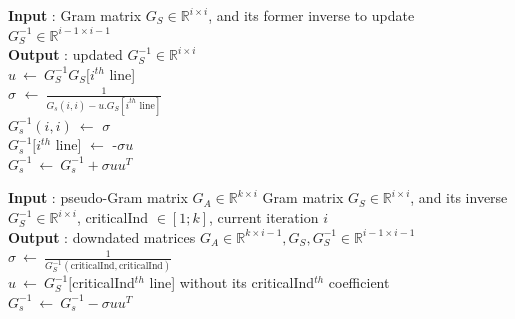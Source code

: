 \documentclass{ipol}
\newcommand{\dsize}{k}
\begin{document}
\newpage

\begin{algorithm}[H]

\SetLine
\textbf{Input} : Gram matrix $G_S \in \mathbb{R}^{i \times i}$, and its former inverse to update $G_S^{-1}\in \mathbb{R}^{i-1 \times i-1}$\\
\textbf{Output} : updated  $G_S^{-1}\in \mathbb{R}^{i \times i}$\\
$u \ \leftarrow \ G_S^{-1} G_S[i^{th}$ line]\\
$\sigma$ $\leftarrow \ \frac{1}{G_s(i,i) - u.G_S[i^{th} \text{ line}]}$\\
$G_s^{-1}(i,i)\ \leftarrow$ $\sigma$\\
$G_s^{-1}[i^{th}$ line] $\leftarrow$ -$\sigma u$\\
\Return $G_s^{-1} \ \leftarrow \ G_s^{-1}+\sigma u u^T$\\
\caption{\textit{updateGram} {\color{blue} Marc: Algo correspondant, mais \`a valider.}}

\end{algorithm}

\begin{algorithm}[H]

\SetLine
\textbf{Input} : pseudo-Gram matrix $G_A \in \mathbb{R}^{\dsize \times i}$
Gram matrix $G_S \in \mathbb{R}^{i \times i}$, and its 
inverse $G_S^{-1}\in \mathbb{R}^{i \times i}$, criticalInd $\in [1; \dsize]$, current iteration $i$\\
\textbf{Output} : downdated matrices $G_A \in \mathbb{R}^{\dsize \times i-1}, G_S, G_S^{-1} \in \mathbb{R}^{i-1 \times i-1}$\\

$\sigma \ \leftarrow \ \frac{1}{G_S^{-1}(\text{criticalInd}, \text{criticalInd})}$\\
$u \ \leftarrow \ G_S^{-1} [$criticalInd$^{th}$ line] without its criticalInd$^{th}$ coefficient\\
$G_s^{-1} \ \leftarrow \ G_s^{-1}-\sigma u u^T$\\

\caption{\textit{downdateGram} {\color{blue} Marc: Algo correspondant, mais \`a valider.}}

\end{algorithm}
\end{document}
